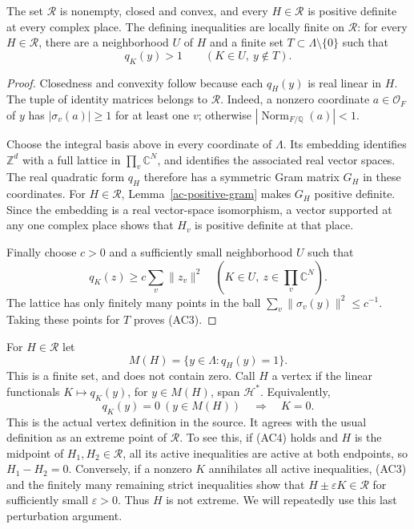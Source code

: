 \begin{proposition}\label{ac-polyhedron}
The set $\mathcal R$ is nonempty, closed and convex, and every
$H\in\mathcal R$ is positive definite at every complex place.
The defining inequalities are locally finite on $\mathcal R$:
for every $H\in\mathcal R$, there are a neighborhood $U$ of $H$
and a finite set $T\subset\Lambda\setminus\{0\}$ such that
\[
          q_K(y)>1\qquad(K\in U,\ y\notin T).
          \tag{AC3}
\]
\end{proposition}
\begin{proof}
Closedness and convexity follow because each $q_H(y)$ is real
linear in $H$.  The tuple of identity matrices belongs to
$\mathcal R$.  Indeed, a nonzero coordinate $a\in\mathcal O_F$
of $y$ has $|\sigma_v(a)|\ge1$ for at least one $v$;
otherwise $|\operatorname{Norm}_{F/\mathbb Q}(a)|<1$.

Choose the integral basis above in every coordinate of $\Lambda$.
Its embedding identifies $\mathbb Z^d$ with a full lattice in
$\prod_v\mathbb C^N$, and identifies the associated real vector
spaces.  The real quadratic form $q_H$ therefore has a symmetric
Gram matrix $G_H$ in these coordinates.  For $H\in\mathcal R$,
Lemma~\ref{ac-positive-gram} makes $G_H$ positive definite.
Since the embedding is a real vector-space isomorphism, a vector
supported at any one complex place shows that $H_v$ is positive
definite at that place.

Finally choose $c>0$ and a sufficiently small neighborhood $U$
such that
\[
 q_K(z)\ge c\sum_v\|z_v\|^2
       \quad(K\in U,\ z\in\prod_v\mathbb C^N).
\]
The lattice has only finitely many points in the ball
$\sum_v\|\sigma_v(y)\|^2\le c^{-1}$.  Taking these points for $T$
proves (AC3).
\end{proof}

For $H\in\mathcal R$ let
\[
                  M(H)=\{y\in\Lambda:q_H(y)=1\}.
\]
This is a finite set, and does not contain zero.
Call $H$ a vertex if the linear functionals
$K\mapsto q_K(y)$, for $y\in M(H)$, span $\mathcal H^*$.
Equivalently,
\[
 q_K(y)=0\ (y\in M(H))\quad\Longrightarrow\quad K=0.
 \tag{AC4}
\]
This is the actual vertex definition in the source.  It agrees
with the usual definition as an extreme point of $\mathcal R$.
To see this, if (AC4) holds and $H$ is the midpoint of
$H_1,H_2\in\mathcal R$, all its active inequalities are active
at both endpoints, so $H_1-H_2=0$.
Conversely, if a nonzero $K$ annihilates all active inequalities,
(AC3) and the finitely many remaining strict inequalities show
that $H\pm\varepsilon K\in\mathcal R$ for sufficiently small
$\varepsilon>0$.  Thus $H$ is not extreme.
We will repeatedly use this last perturbation argument.


